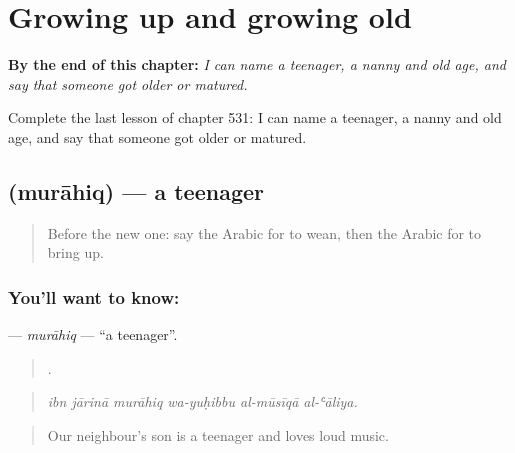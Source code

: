
\chapter{Growing up and growing old}
\label{ch:ar-growing-up-and-growing-old}

\begin{chapteropening}
\textbf{By the end of this chapter:} \emph{I can name a teenager, a nanny and old age, and say that someone got older or matured.}

Complete the last lesson of chapter 531: I can name a teenager, a nanny and old age, and say that someone got older or matured.
\end{chapteropening}

\section[\texorpdfstring{\ar{مراهق} (murāhiq)}{مراهق (murāhiq)}]{ (murāhiq) — a teenager}

\label{lesson:AR-C531-murahiq}



\begin{quote}
Before the new one: say the Arabic for to wean, then the Arabic for to bring up.
\end{quote}

\subsection*{You'll want to know: }
\textbf{} — \emph{murāhiq} — \textquotedblleft{}a teenager\textquotedblright{}.

\begin{quote}
     .
\end{quote}

\begin{quote}
\emph{ibn jārinā murāhiq wa-yuḥibbu al-mūsīqā al-ʿāliya.}
\end{quote}

\begin{quote}
Our neighbour's son is a teenager and loves loud music.
\end{quote}

